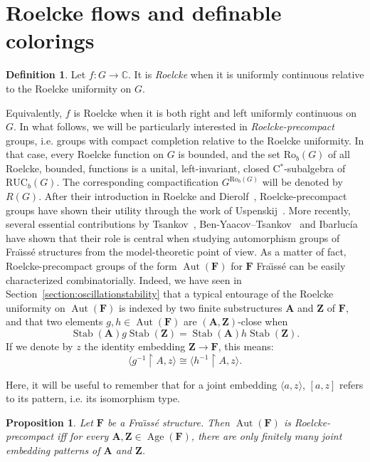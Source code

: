 \documentclass[11pt]{article}
\newtheorem{prop}[theo]{Proposition}
\theoremstyle{definition}
\newtheorem{defi}[theo]{Definition}
\numberwithin{equation}{section}
\numberwithin{figure}{section}
\numberwithin{table}{section}
\newcommand{\CC}{\mathbb{C}}
\newcommand*{\mA}{\mathbf{A}}
\newcommand*{\mF}{\mathbf{F}}
\newcommand*{\mZ}{\mathbf{Z}}
\newcommand{\restrict}[2]{#1 \upharpoonright #2}
\DeclareMathOperator{\Aut}{Aut}
\DeclareMathOperator{\Stab}{Stab}
\DeclareMathOperator{\Age}{Age}
\newcommand{\RUCB}{\mathrm{RUC}_{b}}
\newcommand{\ROB}{\mathrm{Ro}_{b}}
\begin{document}
\section{Roelcke flows and definable colorings}
\label{section:Roelcke}

\begin{defi}
Let $f : G \rightarrow \CC$. It is \emph{Roelcke} when it is uniformly continuous relative to the Roelcke uniformity on $G$.
\end{defi}

Equivalently, $f$ is Roelcke when it is both right and left uniformly continuous on~$G$. In what follows, we will be particularly interested in \emph{Roelcke-precompact} groups, i.e. groups with compact completion relative to the Roelcke uniformity. In that case, every Roelcke function on $G$ is bounded, and the set $\ROB(G)$ of all Roelcke, bounded, functions is a unital, left-invariant, closed C$^{*}$-subalgebra of $\RUCB(G)$. The corresponding compactification $G^{\ROB(G)}$ will be denoted by $R(G)$. After their introduction in Roelcke and Dierolf~\cite{RD}, Roelcke-precompact groups have shown their utility through the work of Uspenskij~\cite{Us3, Us4, Us5}. More recently, several essential contributions by Tsankov~\cite{Ts}, Ben-Yaacov--Tsankov~\cite{BYT} and Ibarluc\'ia~\cite{I0, I1} have shown that their role is central when studying automorphism groups of Fra\"{\i}ss\'e structures from the model-theoretic point of view. As a matter of fact, Roelcke-precompact groups of the form $\Aut(\mF)$ for $\mF$ Fra\"{\i}ss\'e can be easily characterized combinatorially. Indeed, we have seen in Section~\ref{section:oscillationstability} that a typical entourage of the Roelcke uniformity on $\Aut(\mF)$ is indexed by two finite substructures $\mA$ and $\mZ$ of $\mF$, and that two elements $g,h\in \Aut(\mF)$ are $(\mA, \mZ)$-close when
\[
\Stab(\mA)g\Stab(\mZ)=\Stab(\mA)h\Stab(\mZ).
\]
If we denote by $z$ the identity embedding $\mZ\to \mF$, this means:
\[
\langle \restrict{g^{-1}}{A}, z \rangle\cong \langle \restrict{h^{-1}}{A}, z \rangle.
\]

Here, it will be useful to remember that for a joint embedding $\langle a,z\rangle$, $[a,z]$ refers to its pattern, i.e. its isomorphism type.

\begin{prop}\label{prop:Roelcke-precompact}
Let $\mF$ be a Fra\"{\i}ss\'e structure. Then $\Aut(\mF)$ is Roelcke-precompact iff for every $\mA, \mZ \in \Age(\mF)$, there are only finitely many joint embedding patterns of $\mA$ and $\mZ$.
\end{prop}
\end{document}
